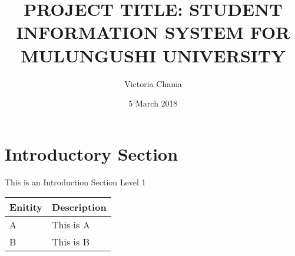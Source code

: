 \documentclass{article}
\title{PROJECT TITLE: STUDENT INFORMATION SYSTEM FOR MULUNGUSHI UNIVERSITY}
\author{Victoria Chama}
\date{5 March 2018}
\begin{document}
	
		\maketitle
	
	\section{Introductory Section}
	This is an Introduction Section Level 1
	
	\begin{tabular}{|l|l|}
		\hline
		Enitity & Description \\
		\hline
		A & This is A \\
		\hline
		B & This is B \\
		\hline
	\end{tabular}
	
\end{document}
